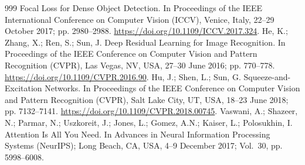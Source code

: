\documentclass[life,article,submit,moreauthors]{Definitions/mdpi}
\begin{document}
\begin{thebibliography}{999}
\newblock Focal Loss for Dense Object Detection.
\newblock In Proceedings of the IEEE International Conference on Computer Vision (ICCV), Venice, Italy, 22--29 October 2017; pp. 2980--2988. \url{https://doi.org/10.1109/ICCV.2017.324}.
He, K.; Zhang, X.; Ren, S.; Sun, J.
\newblock Deep Residual Learning for Image Recognition.
\newblock In Proceedings of the IEEE Conference on Computer Vision and Pattern Recognition (CVPR), Las Vegas, NV, USA, 27--30 June 2016; pp. 770--778. \url{https://doi.org/10.1109/CVPR.2016.90}.
Hu, J.; Shen, L.; Sun, G.
\newblock Squeeze-and-Excitation Networks.
\newblock In Proceedings of the IEEE Conference on Computer Vision and Pattern Recognition (CVPR), Salt Lake City, UT, USA, 18--23 June 2018; pp. 7132--7141. \url{https://doi.org/10.1109/CVPR.2018.00745}.
Vaswani, A.; Shazeer, N.; Parmar, N.; Uszkoreit, J.; Jones, L.; Gomez, A.N.; Kaiser, L.; Polosukhin, I.
\newblock Attention Is All You Need.
\newblock In Advances in Neural Information Processing Systems (NeurIPS); Long Beach, CA, USA, 4--9 December 2017; Vol.~30, pp. 5998--6008.


\end{thebibliography}
\end{document}
